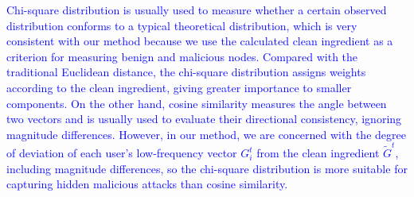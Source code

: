 \documentclass[a4paper,twoside,11pt,dvipsnames]{reviewresponse}
\begin{document}
\textcolor{blue}{
Chi-square distribution is usually used to measure whether a certain observed distribution conforms to a typical theoretical distribution, which is very consistent with our method because we use the calculated clean ingredient as a criterion for measuring benign and malicious nodes. Compared with the traditional Euclidean distance, the chi-square distribution assigns weights according to the clean ingredient, giving greater importance to smaller components. On the other hand, cosine similarity measures the angle between two vectors and is usually used to evaluate their directional consistency, ignoring magnitude differences. However, in our method, we are concerned with the degree of deviation of each user's low-frequency vector $G_i^t$ from the clean ingredient $\tilde{G}^t$, including magnitude differences, so the chi-square distribution is more suitable for capturing hidden malicious attacks than cosine similarity.
}
\end{document}
